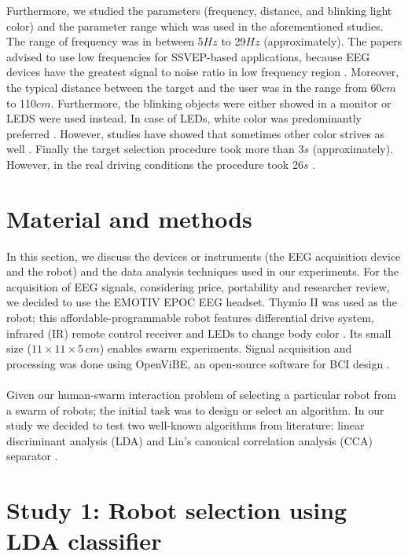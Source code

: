 \documentclass{svmult}
\begin{document}
Furthermore, we studied the parameters (frequency, distance, and blinking light color) and the parameter range which was used in the aforementioned studies. The range of frequency was in between 5$Hz$ to 29$Hz$ (approximately). The papers advised to use low frequencies for SSVEP-based applications, because EEG devices have the greatest signal to noise ratio in low frequency region \cite{paper6}. Moreover, the typical distance between the target and the user was in the range from 60$cm$ to 110$cm$. Furthermore, the blinking objects were either showed in a monitor or LEDS were used instead. In case of LEDs, white color was predominantly preferred \cite{aljshamee2014beyond, aljshamee2016discriminate}. However, studies have showed that sometimes other color strives as well \cite{SSVEPfiability}. Finally the target selection procedure took more than 3$s$ (approximately). However, in the real driving conditions the procedure took 26$s$ \cite{car}.

\section{Material and methods}
\label{sec:methods}
In this section, we discuss the devices or instruments (the EEG acquisition device and the robot) and the data analysis techniques used in our experiments. For the acquisition of EEG signals, considering price, portability and researcher review, we decided to use the EMOTIV EPOC EEG headset. Thymio II was used as the robot; this affordable-programmable robot features differential drive system, infrared (IR) remote control receiver and LEDs to change body color \cite{Riedo-et-al-2013}. Its small size ($11 \times 11 \times 5\,\mathit{cm}$) enables swarm experiments. Signal acquisition and processing was done using OpenViBE, an open-source software for BCI design \cite{ov_publication}.\\
\\
Given our human-swarm interaction problem of selecting a particular robot from a swarm of robots; the initial task was to design or select an algorithm. In our study we decided to test two well-known algorithms from literature: linear discriminant analysis (LDA) \cite{openvibeSSVEP} and Lin's canonical correlation analysis (CCA) separator \cite{Lin2014}.\\

\section{Study 1: Robot selection using LDA classifier}
\label{sec:ML_approach}
\end{document}
